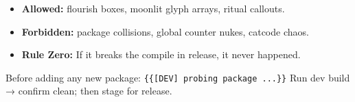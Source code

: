 \begin{PrivateBlock}
\begin{whisper}
\end{whisper}

\begin{itemize}
  \item \textbf{Allowed:} flourish boxes, moonlit glyph arrays, ritual callouts.
  \item \textbf{Forbidden:} package collisions, global counter nukes, catcode chaos.
  \item \textbf{Rule Zero:} If it breaks the compile in release, it never happened.
\end{itemize}

\begin{ritual}
Before adding any new package:  
\texttt{\string\DevOnly\{\string\typeout\{[DEV] probing package ...\}\}}  
Run dev build → confirm clean; then stage for release.
\end{ritual}
\end{PrivateBlock}
